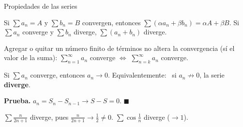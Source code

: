 \documentclass[10pt,aspectratio=169]{beamer}
\begin{document}
\begin{frame}{Propiedades de las series}
  \begin{teorema}[linealidad]
    Si $\sum a_n=A$ y $\sum b_n=B$ convergen, entonces $\sum(\alpha a_n+\beta b_n)=\alpha A+\beta B$.
    Si $\sum a_n$ converge y $\sum b_n$ diverge, $\sum(a_n+b_n)$ diverge.
  \end{teorema}
  \begin{proposicion}[colas]
    Agregar o quitar un número finito de términos no altera la convergencia (sí el valor de la suma):
    $\sum_{n=1}^\infty a_n$ converge $\iff$ $\sum_{n=k}^\infty a_n$ converge.
  \end{proposicion}
  \begin{teorema}
    Si $\sum a_n$ converge, entonces $a_n\to0$. \quad Equivalentemente: \ si $a_n\not\to0$, la serie \textbf{diverge}.
  \end{teorema}
  \textbf{Prueba.} $a_n=S_n-S_{n-1}\to S-S=0$. $\blacksquare$
  \begin{ejemplo}
    $\displaystyle\sum\frac{n}{2n+1}$ diverge, pues $\frac{n}{2n+1}\to\frac12\ne0$. \quad $\displaystyle\sum\cos\frac1n$ diverge ($\to1$).
  \end{ejemplo}
\end{frame}
\end{document}
